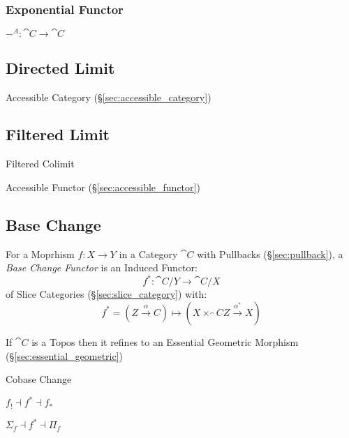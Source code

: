 \subsubsection{Exponential Functor}\label{sec:exponential_functor}

$-^A : \cat{C} \rightarrow \cat{C}$



\subsection{Directed Limit}\label{sec:directed_limit}

Accessible Category (\S\ref{sec:accessible_category})



\subsection{Filtered Limit}\label{sec:filtered_limit}

Filtered Colimit

Accessible Functor (\S\ref{sec:accessible_functor})


\subsection{Base Change}\label{sec:base_change}

For a Moprhism $f : X \rightarrow Y$ in a Category $\cat{C}$ with
Pullbacks (\S\ref{sec:pullback}), a \emph{Base Change Functor} is an
Induced Functor:
\[
  f^* : \cat{C}/Y \rightarrow \cat{C}/X
\]
of Slice Categories (\S\ref{sec:slice_category}) with:
\[
  f^* = (Z \xrightarrow{\alpha} C) \mapsto
    (X \times_\cat{C} Z \xrightarrow{\alpha^*} X)
\]

If $\cat{C}$ is a Topos then it refines to an Essential Geometric
Morphism (\S\ref{sec:essential_geometric})


Cobase Change

$f_! \dashv f^* \dashv f_*$

$\Sigma_f \dashv f^* \dashv \Pi_f$



